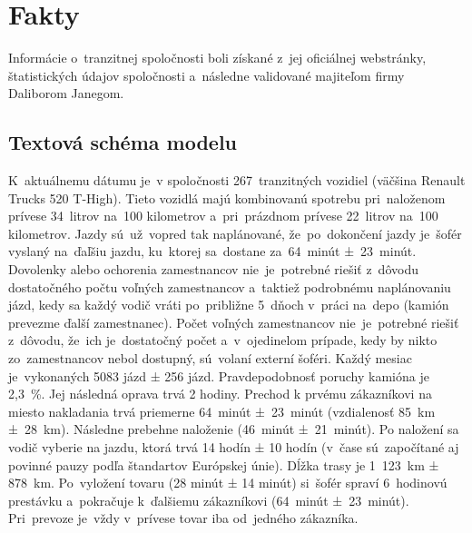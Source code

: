 \documentclass[a4paper, 11pt]{article}
\begin{document}
    \newpage
	\section{Fakty}
	Informácie o~tranzitnej spoločnosti boli získané z~jej oficiálnej
    webstránky, štatistických údajov spoločnosti a~následne validované
    majiteľom firmy Daliborom Janegom. 

    \subsection{Textová schéma modelu}
    K~aktuálnemu dátumu je~v spoločnosti
    267~tranzitných vozidiel (väčšina Renault Trucks
    520 T-High). Tieto vozidlá majú kombinovanú spotrebu pri~naloženom prívese
    34~litrov na~100 kilometrov a~pri~prázdnom prívese 22~litrov
    na~100 kilometrov.\newline
    Jazdy sú~už~vopred tak naplánované, že~po~dokončení jazdy je~šofér
    vyslaný na~ďaľšiu jazdu, ku~ktorej sa~dostane
    za~64~minút ±~23~minút.
    Dovolenky alebo ochorenia zamestnancov nie~je~potrebné riešiť
    z~dôvodu dostatočného počtu voľných zamestnancov a~taktiež
    podrobnému naplánovaniu jázd, kedy sa každý vodič vráti po~približne
    5~dňoch v~práci na~depo (kamión prevezme ďalší zamestnanec). Počet
    voľných zamestnancov nie~je~potrebné riešiť z~dôvodu, že~ich 
    je~dostatočný počet a~v~ojedinelom prípade, kedy by nikto zo~zamestnancov
    nebol dostupný, sú~volaní externí šoféri. Každý mesiac
    je~vykonaných 5083 jázd  ± 256 jázd. Pravdepodobnosť poruchy
    kamióna je 2,3~\%. Jej následná oprava trvá 2 hodiny.\newline
    Prechod k prvému zákazníkovi na miesto nakladania trvá priemerne 
    64~minút ±~23~minút (vzdialenosť 85~km ±~28~km). Následne prebehne naloženie (46~minút ±~21~minút).
    Po naložení sa vodič vyberie na jazdu, ktorá trvá 14 hodín ± 10 hodín
    (v~čase sú~započítané aj povinné pauzy podľa štandartov Európskej
    únie). Dĺžka trasy je 1~123~km  ± 878~km.
    Po~vyložení tovaru (28 minút ± 14 minút) si~šofér spraví 6~hodinovú prestávku
    a~pokračuje k~ďalšiemu zákazníkovi (64~minút ±~23~minút). Pri~prevoze je~vždy v~prívese
    tovar iba od~jedného zákazníka.\newline
\end{document}
